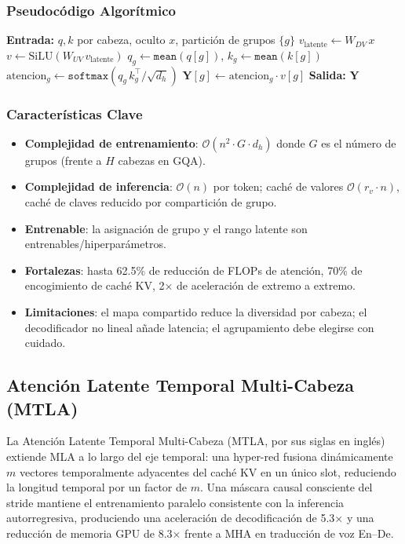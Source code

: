 \subsubsection{Pseudocódigo Algorítmico}
\begin{algorithmic}[1]
\State \textbf{Entrada:} $q, k$ por cabeza, oculto $x$, partición de grupos $\{g\}$
\State $v_{\text{latente}} \gets W_{DV}\, x$ 
\State $v \gets \text{SiLU}(W_{UV}\, v_{\text{latente}})$ 
    \State $q_g \gets \texttt{mean}(q[g])$, \quad $k_g \gets \texttt{mean}(k[g])$ 
    \State $\text{atencion}_g \gets \texttt{softmax}(q_g\, k_g^\top / \sqrt{d_h})$
    \State $\mathbf{Y}[g] \gets \text{atencion}_g \cdot v[g]$ 
\EndFor
\State \textbf{Salida:} $\mathbf{Y}$
\end{algorithmic}

\subsubsection{Características Clave}
\begin{itemize}[leftmargin=*]
    \item \textbf{Complejidad de entrenamiento}: $\mathcal{O}(n^2 \cdot G \cdot d_h)$ donde $G$ es el número de grupos (frente a $H$ cabezas en GQA).
    \item \textbf{Complejidad de inferencia}: $\mathcal{O}(n)$ por token; caché de valores $\mathcal{O}(r_v \cdot n)$, caché de claves reducido por compartición de grupo.
    \item \textbf{Entrenable}: la asignación de grupo y el rango latente son entrenables/hiperparámetros.
    \item \textbf{Fortalezas}: hasta 62.5\% de reducción de FLOPs de atención, 70\% de encogimiento de caché KV, 2$\times$ de aceleración de extremo a extremo.
    \item \textbf{Limitaciones}: el mapa compartido reduce la diversidad por cabeza; el decodificador no lineal añade latencia; el agrupamiento debe elegirse con cuidado.
\end{itemize}

\subsection{Atención Latente Temporal Multi-Cabeza (MTLA)}
La Atención Latente Temporal Multi-Cabeza (MTLA, por sus siglas en inglés) \citep{deng_mtla_2025} extiende MLA a lo largo del eje temporal: una hyper-red fusiona dinámicamente $m$ vectores temporalmente adyacentes del caché KV en un único slot, reduciendo la longitud temporal por un factor de $m$. Una máscara causal consciente del stride mantiene el entrenamiento paralelo consistente con la inferencia autorregresiva, produciendo una aceleración de decodificación de 5.3$\times$ y una reducción de memoria GPU de 8.3$\times$ frente a MHA en traducción de voz En--De.

